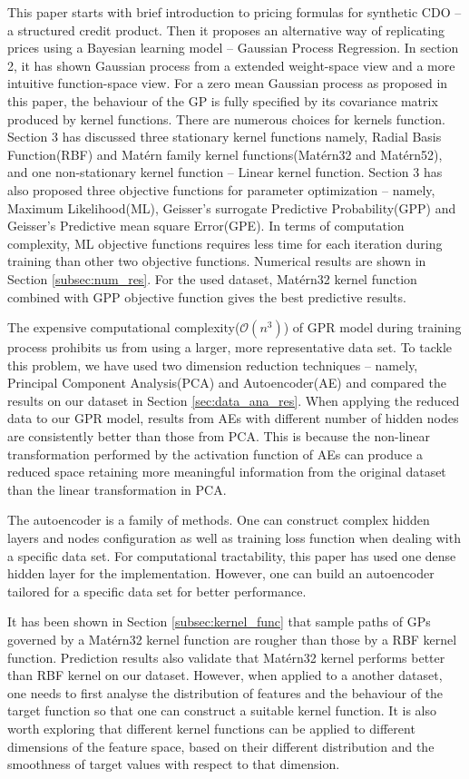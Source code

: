 \documentclass[11pt,a4paper]{article}
\theoremstyle{definition}
\numberwithin{equation}{section}
\begin{document}
		This paper starts with brief introduction to pricing formulas for synthetic CDO -- a structured credit product. Then it proposes an alternative way of replicating prices using a Bayesian learning model -- Gaussian Process Regression. In section 2, it has shown Gaussian process from a extended weight-space view and a more intuitive function-space view. For a zero mean Gaussian process as proposed in this paper, the behaviour of the GP is fully specified by its covariance matrix produced by kernel functions. There are numerous choices for kernels function. Section 3 has discussed three stationary kernel functions namely, Radial Basis Function(RBF) and Mat\'ern family kernel functions(Mat\'ern32 and Mat\'ern52), and one non-stationary kernel function -- Linear kernel function. Section 3 has also proposed three objective functions for parameter optimization -- namely, Maximum Likelihood(ML), Geisser's surrogate  Predictive Probability(GPP) and Geisser's Predictive mean square Error(GPE). In terms of computation complexity, ML objective functions requires less time for each iteration during training than other two objective functions. Numerical results are shown in Section \ref{subsec:num_res}. For the used dataset, Mat\'ern32 kernel function combined with GPP objective function gives the best predictive results.
		
		The expensive computational complexity($\mathcal O(n^3)$) of GPR model during training process prohibits us from using a larger, more representative data set. To tackle this problem, we have used two dimension reduction techniques -- namely, Principal Component Analysis(PCA) and Autoencoder(AE) and compared the results on our dataset in Section \ref{sec:data_ana_res}. When applying the reduced data to our GPR model, results from AEs with different number of hidden nodes are consistently better than those from PCA. This is because the non-linear transformation performed by the activation function of AEs can produce a reduced space retaining more meaningful information from the original dataset than  the linear transformation in PCA.
		
		The autoencoder is a family of methods. One can construct complex hidden layers and nodes configuration as well as training loss function when dealing with a specific data set. For computational tractability, this paper has used one dense hidden layer for the implementation. However, one can build an autoencoder tailored for a specific data set for better performance. 
		
		It has been shown in Section \ref{subsec:kernel_func} that sample paths of GPs governed by a Mat\'ern32 kernel function are rougher than those by a RBF kernel function. Prediction results also validate that Mat\'ern32 kernel performs better than RBF kernel on our dataset. However, when applied to a another dataset, one needs to first analyse the distribution of features and the behaviour of the target function so that one can construct a suitable kernel function. It is also worth exploring that different kernel functions can be applied to different dimensions of the feature space, based on their different distribution and the smoothness of target values with respect to that dimension.
		
\end{document}
